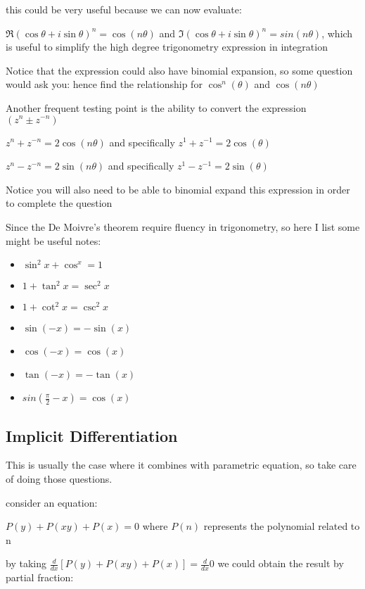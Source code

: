 \documentclass[]{article}
\begin{document}
this could be very useful because we can now evaluate:

\(\Re {(\cos\theta+ i\sin\theta)^n} = \cos(n\theta)\) and
\(\Im{(\cos\theta + i\sin\theta)^n} = sin(n\theta)\), which is useful to
simplify the high degree trigonometry expression in integration

Notice that the expression could also have binomial expansion, so some
question would ask you: hence find the relationship for
\(\cos^n(\theta)\) and \(\cos(n\theta)\)

Another frequent testing point is the ability to convert the expression
\((z^n \pm z^{-n})\)

\(z^n + z^{-n} = 2\cos(n\theta)\) and specifically
\(z^1 + z^{-1} = 2\cos(\theta)\)

\(z^n - z^{-n} = 2\sin(n\theta)\) and specifically
\(z^1 - z^{-1} = 2\sin(\theta)\)

Notice you will also need to be able to binomial expand this expression
in order to complete the question

Since the De Moivre's theorem require fluency in trigonometry, so here I
list some might be useful notes:

\begin{itemize}
\item
  \(\sin^2x + \cos^x = 1\)
\item
  \(1 + \tan^2x = \sec^2x\)
\item
  \(1+\cot^2x = \csc^2x\)
\item
  \(\sin(-x) = -\sin(x)\)
\item
  \(\cos(-x) = \cos(x)\)
\item
  \(\tan(-x) = -\tan(x)\)
\item
  \(sin(\frac{\pi}{2} - x) = \cos(x)\) 
\end{itemize}

\subsection{Implicit Differentiation}\label{header-n36}

This is usually the case where it combines with parametric equation, so
take care of doing those questions.

consider an equation:

\(P(y) + P(xy) + P(x) = 0\) where \(P(n)\) represents the polynomial
related to n

by taking \(\frac{d}{dx}[P(y) + P(xy) + P(x) ] = \frac{d}{dx}0\) we
could obtain the result by partial fraction:
\end{document}
